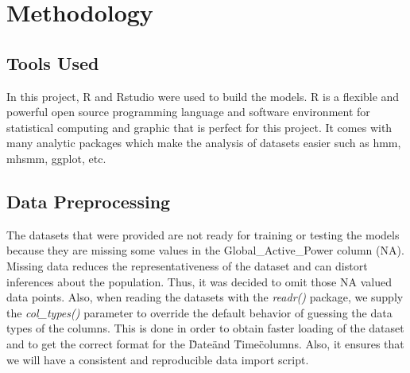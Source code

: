 \documentclass[letterpaper, 11pt]{article}%
\begin{document}
\section{Methodology}
\subsection{Tools Used}
In this project, R and Rstudio were used to build the models. R is a flexible and powerful open source programming language and software environment for statistical computing and graphic that is perfect for this project\cite{r}. It comes with many analytic packages which make the analysis of datasets easier such as hmm, mhsmm, ggplot, etc.

\subsection{Data Preprocessing}
The datasets that were provided are not ready for training or testing the models because they are missing some values in the Global\_Active\_Power column (NA). Missing data reduces the representativeness of the dataset and can distort inferences about the population\cite{missing}. Thus, it was decided to omit those NA valued data points. Also, when reading the datasets with the \textit{readr()} package, we supply the \textit{col\_types()} parameter to override the default behavior of guessing the data types of the columns. This is done in order to obtain faster loading of the dataset and to get the correct format for the \"Date\" and \"Time\" columns. Also, it ensures that we will have a consistent and reproducible data import script\cite{datascience}.
\end{document}
